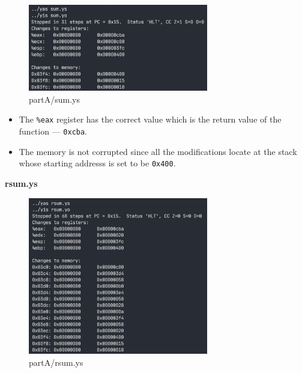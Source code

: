 \documentclass{article}
\begin{document}
\begin{figure}[H] %
        \centering %
        \includegraphics[width=0.7\textwidth]{partA-sum-bz.png} %
        \caption{partA/sum.ys} %
        \label{Fig.partA-sum} %
\end{figure}
\begin{itemize}
        \item The \texttt{\%eax} register has the correct value which is the return value of the function --- \texttt{0xcba}.
        \item The memory is not corrupted since all the modifications locate at the stack whose starting addresss is set to be \texttt{0x400}.
\end{itemize}
\textbf{rsum.ys}\\

\begin{figure}[H] %
        \centering %
        \includegraphics[width=0.7\textwidth]{partA-rsum-bz.png} %
        \caption{partA/rsum.ys} %
        \label{Fig.partA-rsum} %
\end{figure}
\end{document}
